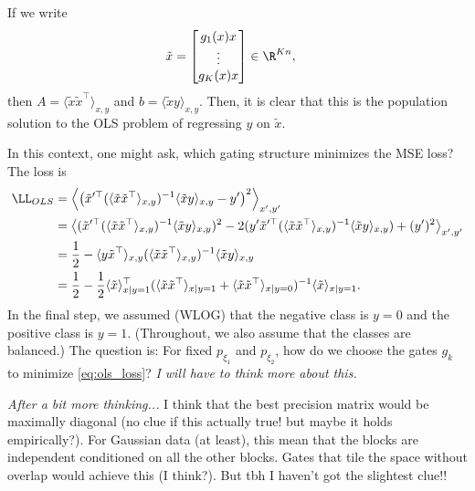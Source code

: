 \documentclass{article}
\begin{document}
If we write
\begin{align}
  \tilde{x} &= \begin{bmatrix} g_1(x) x \\ \vdots \\ g_K(x) x \end{bmatrix} \in \R^{Kn},
\end{align}
then $A = \langle \tilde{x} \tilde{x}^\top \rangle_{x,y}$ and $b = \langle \tilde{x} y \rangle_{x,y}$.
Then, it is clear that this is the population solution to the OLS problem of regressing $y$ on $\tilde{x}$.

In this context, one might ask, which gating structure minimizes the MSE loss?
The loss is
\begin{align}
  \LL_{OLS} &= \left\langle \left( \tilde{x}'^\top (\langle \tilde{x} \tilde{x}^\top \rangle_{x,y})^{-1} \langle \tilde{x} y \rangle_{x,y} - y' \right)^2 \right\rangle_{x',y'} \\
  &= \left\langle ( \tilde{x}'^\top (\langle \tilde{x} \tilde{x}^\top \rangle_{x,y})^{-1} \langle \tilde{x} y \rangle_{x,y} )^2 - 2 ( y' \tilde{x}'^\top (\langle \tilde{x} \tilde{x}^\top \rangle_{x,y})^{-1} \langle \tilde{x} y \rangle_{x,y} ) + (y')^2 \right\rangle_{x',y'} \\
  &= \frac{1}{2} - \langle y \tilde{x}^\top \rangle_{x,y} (\langle \tilde{x} \tilde{x}^\top \rangle_{x,y})^{-1} \langle \tilde{x} y \rangle_{x,y} \\
  &= \frac{1}{2} - \frac{1}{2} \langle \tilde{x} \rangle_{x \mid y=1}^\top (\langle \tilde{x} \tilde{x}^\top \rangle_{x \mid y=1} + \langle \tilde{x} \tilde{x}^\top \rangle_{x \mid y=0})^{-1} \langle \tilde{x} \rangle_{x \mid y=1}. \label{eq:ols_loss}
\end{align}
In the final step, we assumed (WLOG) that the negative class is $y=0$ and the positive class is $y=1$.
(Throughout, we also assume that the classes are balanced.)
The question is: For fixed $p_{\xi_1}$ and $p_{\xi_2}$, how do we choose the gates $g_k$ to minimize \cref{eq:ols_loss}?
\emph{I will have to think more about this.}

\emph{After a bit more thinking...}
I think that the best precision matrix would be maximally diagonal (no clue if this actually true! but maybe it holds empirically?).
For Gaussian data (at least), this mean that the blocks are independent conditioned on all the other blocks.
Gates that tile the space without overlap would achieve this (I think?).
But tbh I haven't got the slightest clue!!
\end{document}
